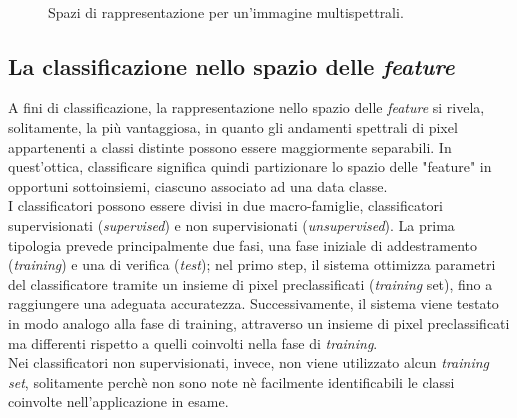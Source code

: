 \begin{figure}[!ht]
\center
{}
\hspace{3mm}
\\
\caption{Spazi di rappresentazione per un'immagine multispettrali.}
\label{fig:spaziorappresentazione}
\end{figure}



\subsection{La classificazione nello spazio delle \emph{feature}}

A fini di classificazione, la rappresentazione nello spazio delle \emph{feature} si rivela, solitamente, la più vantaggiosa, in quanto gli andamenti spettrali di pixel appartenenti a classi distinte possono essere maggiormente separabili. In quest'ottica, classificare significa quindi partizionare lo spazio delle "feature" in opportuni sottoinsiemi, ciascuno associato ad una data classe.
\\

I classificatori possono essere divisi in due macro-famiglie, classificatori supervisionati (\emph{supervised}) e non supervisionati (\emph{unsupervised}). La prima tipologia prevede principalmente due fasi, una fase iniziale di addestramento (\emph{training}) e una di verifica (\emph{test}); nel primo step, il sistema ottimizza parametri del classificatore tramite un insieme di pixel preclassificati (\emph{training} set), fino a raggiungere una adeguata accuratezza. Successivamente, il sistema viene testato in modo analogo alla fase di training, attraverso un insieme di pixel preclassificati ma differenti rispetto a quelli coinvolti nella fase di \emph{training}.\\
Nei classificatori non supervisionati, invece, non viene utilizzato alcun \emph{training set}, solitamente perchè non sono note nè facilmente identificabili le classi coinvolte nell'applicazione in esame. 
\\

